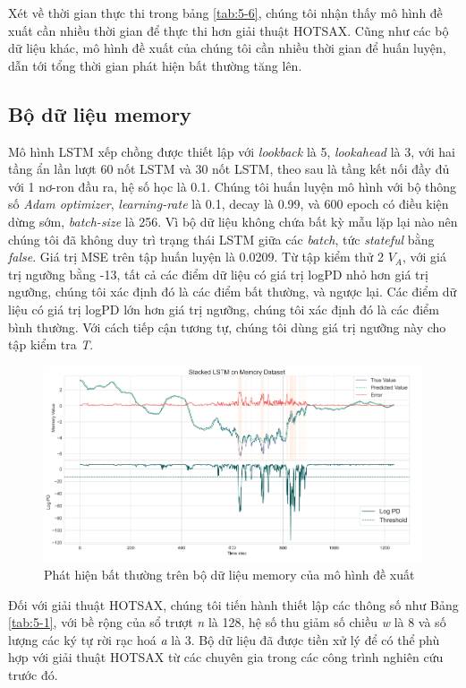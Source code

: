 Xét về thời gian thực thi trong bảng \ref{tab:5-6}, chúng tôi nhận thấy mô hình đề xuất cần nhiều thời gian để thực thi hơn giải thuật HOTSAX. Cũng như các bộ dữ liệu khác, mô hình đề xuất của chúng tôi cần nhiều thời gian để huấn luyện, dẫn tới tổng thời gian phát hiện bất thường tăng lên.

\subsection{Bộ dữ liệu memory}
Mô hình LSTM xếp chồng được thiết lập với \textit{lookback} là 5, \textit{lookahead} là 3, với hai tầng ẩn lần lượt 60 nốt LSTM và 30 nốt LSTM, theo sau là tầng kết nối đầy đủ với 1 nơ-ron đầu ra, hệ số học là 0.1. Chúng tôi huấn luyện mô hình với bộ thông số \textit{Adam optimizer}, \textit{learning-rate} là 0.1, decay là 0.99, và 600 epoch có điều kiện dừng sớm, \textit{batch-size} là 256. Vì bộ dữ liệu không chứa bất kỳ mẫu lặp lại nào nên chúng tôi đã không duy trì trạng thái LSTM giữa các \textit{batch}, tức \textit{stateful} bằng \textit{false}. Giá trị MSE trên tập huấn luyện là 0.0209. Từ tập kiểm thử 2 $V_{A}$, với giá trị ngưỡng bằng -13, tất cả các điểm dữ liệu có giá trị logPD nhỏ hơn giá trị ngưỡng, chúng tôi xác định đó là các điểm bất thường, và ngược lại. Các điểm dữ liệu có giá trị logPD lớn hơn giá trị ngưỡng, chúng tôi xác định đó là các điểm bình thường. Với cách tiếp cận tương tự, chúng tôi dùng giá trị ngưỡng này cho tập kiểm tra \textit{T}.

\begin{figure}[H]
    \centering
    \includegraphics[scale=1]{./content/images/5-13.png}
    \caption{Phát hiện bất thường trên bộ dữ liệu memory của mô hình đề xuất}
    \label{fig:5-13}
\end{figure}

Đối với giải thuật HOTSAX, chúng tôi tiến hành thiết lập các thông số như Bảng \ref{tab:5-1}, với bề rộng của sổ trượt \textit{n} là 128, hệ số thu giảm số chiều \textit{w} là 8 và số lượng các ký tự rời rạc hoá \textit{a} là 3. Bộ dữ liệu đã được tiền xử lý để có thể phù hợp với giải thuật HOTSAX từ các chuyên gia trong các công trình nghiên cứu trước đó.

